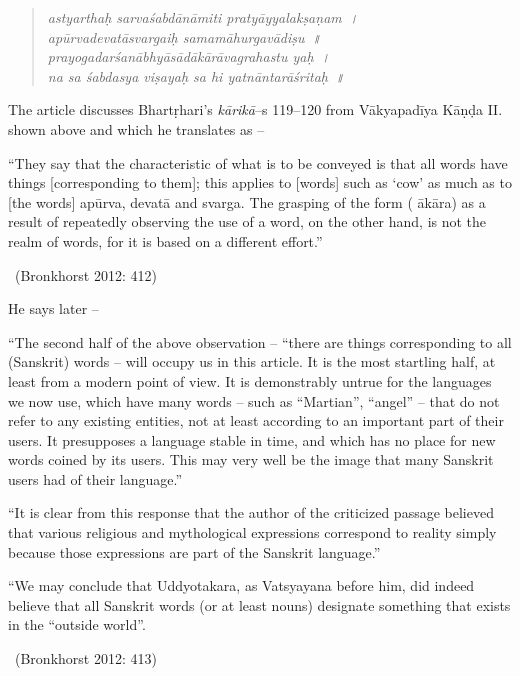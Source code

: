 \begin{verse}
\textit{astyarthaḥ sarvaśabdānāmiti pratyāyyalakṣaṇam~।}\\\textit{apūrvadevatāsvargaiḥ samamāhurgavādiṣu~॥}\\\textit{prayogadarśanābhyāsādākārāvagrahastu yaḥ~।}\\\textit{na sa śabdasya viṣayaḥ sa hi yatnāntarāśritaḥ~॥} 
\end{verse}

The article discusses Bhartṛhari’s \textit{kārikā}–s 119–120 from Vākyapadīya Kāṇḍa II. shown above and which he translates as –

\begin{myquote}
“They say that the characteristic of what is to be conveyed is that all words have things [corresponding to them]; this applies to [words] such as ‘cow’ as much as to [the words] apūrva, devatā and svarga. The grasping of the form ( ākāra) as a result of repeatedly observing the use of a word, on the other hand, is not the realm of words, for it is based on a different effort.” 

~\hfill (Bronkhorst 2012: 412)
\end{myquote}

He says later –

\begin{myquote}
“The second half of the above observation – “there are things corresponding to all (Sanskrit) words – will occupy us in this article. It is the most startling half, at least from a modern point of view. It is demonstrably untrue for the languages we now use, which have many words – such as “Martian”, “angel” – that do not refer to any existing entities, not at least according to an important part of their users. It presupposes a language stable in time, and which has no place for new words coined by its users. This may very well be the image that many Sanskrit users had of their language.”
\end{myquote}

\begin{myquote}
“It is clear from this response that the author of the criticized passage believed that various religious and mythological expressions correspond to reality simply because those expressions are part of the Sanskrit language.”
\end{myquote}

\begin{myquote}
“We may conclude that Uddyotakara, as Vatsyayana before him, did indeed believe that all Sanskrit words (or at least nouns) designate something that exists in the “outside world”. 

~\hfill (Bronkhorst 2012: 413)
\end{myquote}

